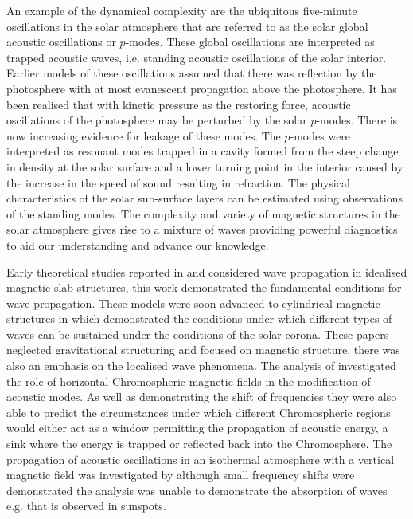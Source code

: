\documentclass[linenumbers]{aastex63}
\begin{document}
An example of the dynamical complexity are the ubiquitous five-minute oscillations in the solar atmosphere that are referred to as the solar global acoustic oscillations or $p$-modes. These global oscillations are interpreted as trapped acoustic waves, i.e. standing acoustic oscillations of the solar interior. Earlier models of these oscillations assumed that there was reflection by the photosphere with at most evanescent propagation above the photosphere. It has been realised that with kinetic pressure as the restoring force, acoustic oscillations of the photosphere may be perturbed by the solar $p$-modes. There is now increasing evidence for leakage of these modes. The $p$-modes were interpreted as resonant modes trapped in a cavity formed from the steep change in density at the solar surface and a lower turning point in the interior caused by the increase in the speed of sound resulting in refraction. The physical characteristics of the solar sub-surface layers can be estimated using observations of the standing modes. The complexity and variety of magnetic structures in the solar atmosphere gives rise to a mixture of waves providing powerful diagnostics to aid our understanding and advance our knowledge.

Early theoretical studies reported in \citet{Roberts1981a} and \citet{Roberts1981b} considered wave propagation in idealised magnetic slab structures, this work demonstrated the fundamental conditions for wave propagation. These models were soon advanced to cylindrical magnetic structures in \citet{EdwinandRoberts1983} which demonstrated the conditions under which different types of waves can be sustained under the conditions of the solar corona. These papers neglected gravitational structuring and focused on magnetic structure, there was also an emphasis on the localised wave phenomena.  The analysis of \citet{Campbell1989} investigated the role of horizontal Chromospheric magnetic fields in the modification of acoustic modes. As well as demonstrating the shift of frequencies they were also able to predict the circumstances under which different Chromospheric regions would either act as a window permitting the propagation of acoustic energy,  a sink where the energy is trapped or reflected back into the Chromosphere. The propagation of acoustic oscillations in an isothermal atmosphere with a vertical magnetic field was investigated by \citet{Hindman1996} although small frequency shifts were demonstrated the analysis was unable to demonstrate the absorption of waves  e.g. that is observed in sunspots.  
\end{document}
